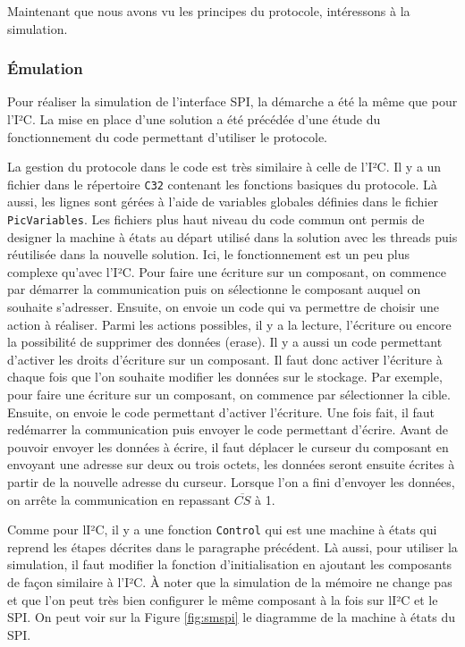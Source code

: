 \documentclass[a4paper]{article}
\begin{document}
Maintenant que nous avons vu les principes du protocole, intéressons à la
simulation.

\subsubsection*{Émulation}

Pour réaliser la simulation de l'interface SPI, la démarche a été la même que
pour l'I²C. La mise en place d'une solution a été précédée d'une étude du
fonctionnement du code permettant d'utiliser le protocole.

La gestion du protocole dans le code est très similaire à celle de l'I²C. Il y a
un fichier dans le répertoire \verb|C32| contenant les fonctions basiques
du protocole. Là aussi, les lignes sont gérées à l'aide de variables globales
définies dans le fichier \verb|PicVariables|. Les fichiers plus haut niveau
du code commun ont permis de designer la machine à états au départ utilisé dans
la solution avec les threads puis réutilisée dans la nouvelle solution. Ici, le
fonctionnement est un peu plus complexe qu'avec l'I²C. Pour faire une écriture
sur un composant, on commence par démarrer la communication puis on sélectionne
le composant auquel on souhaite s'adresser. Ensuite, on envoie un code qui va
permettre de choisir une action à réaliser. Parmi les actions possibles, il y a
la lecture, l'écriture ou encore la possibilité de supprimer des données
(erase). Il y a aussi un code permettant d'activer les droits d'écriture sur un
composant. Il faut donc activer l'écriture à chaque fois que l'on souhaite
modifier les données sur le stockage. Par exemple, pour faire une écriture sur
un composant, on commence par sélectionner la cible. Ensuite, on envoie le code
permettant d'activer l'écriture. Une fois fait, il faut redémarrer la
communication puis envoyer le code permettant d'écrire. Avant de pouvoir envoyer
les données à écrire, il faut déplacer le curseur du composant en envoyant une
adresse sur deux ou trois octets, les données seront ensuite écrites à partir de
la nouvelle adresse du curseur. Lorsque l'on a fini d'envoyer les données, on
arrête la communication en repassant $\overline{CS}$ à 1.

Comme pour lI²C, il y a une fonction \verb|Control| qui est une machine à états
qui reprend les étapes décrites dans le paragraphe précédent. Là aussi, pour
utiliser la simulation, il faut modifier la fonction d'initialisation en
ajoutant les composants de façon similaire à l'I²C. À noter que la simulation de
la mémoire ne change pas et que l'on peut très bien configurer le même composant
à la fois sur lI²C et le SPI. On peut voir sur la Figure \ref{fig:smspi} le
diagramme de la machine à états du SPI.
\end{document}
